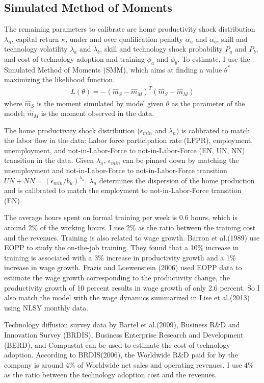 \documentclass[12pt]{article}
\newcommand{\1}{\mathbb{1}}
\begin{document}
\subsection{Simulated Method of Moments}
The remaining parameters to calibrate are home productivity shock distribution $\lambda_n$, capital return $\kappa$, under and over qualification penalty $\alpha_u$ and $\alpha_o$, skill and technology volatility $\lambda_a$ and $\lambda_b$, skill and technology shock probability $P_a$ and $P_b$, and cost of technology adoption and training $\phi_a$ and $\phi_b$. To estimate, I use the Simulated Method of Moments (SMM), which aims at finding a value $\theta^*$ maximizing the likelihood function. 
\begin{align*}
L(\theta) = -(\hat{m}_S-\hat{m}_M)^T(\hat{m}_S-\hat{m}_M)
\end{align*}
where $\hat{m}_S$ is the moment simulated by model given $\theta$ as the parameter of the model; $\hat{m}_M$ is the moment observed in the data. 

The home productivity shock distribution ($\epsilon_{min}$ and $\lambda_n$) is calibrated to match the labor flow in the data: Labor force participation rate (LFPR), employment, unemployment, and not-in-Labor-Force to not-in-Labor-Force (EN, UN, NN) transition in the data. Given $\lambda_n$, $\epsilon_{min}$ can be pinned down by matching the unemployment and not-in-Labor-Force to not-in-Labor-Force transition $UN+NN = (\epsilon_{min}/b_u)^{\lambda_n}$. $\lambda_n$ determines the dispersion of the home production and is calibrated to match the employment to not-in-Labor-Force transition (EN). 

The average hours spent on formal training per week is 0.6 hours, which is around 2\% of the working hours. I use 2\% as the ratio between the training cost and the revenues. Training is also related to wage growth. Barron et al.(1989)\nocite{Barronetal1989
} use EOPP to study the on-the-job training. They found that a 10\% increase in training is associated with a 3\% increase in productivity growth and a 1\% increase in wage growth. Frazis and Loewenstein (2006)\nocite{FrazisLoewenstein2006} used EOPP data to estimate the wage growth corresponding to the productivity change, the productivity growth of 10 percent results in wage growth of only 2.6 percent. So I also match the model with the wage dynamics summarized in Lise et al.(2013)\nocite{Liseetal2013} using NLSY monthly data.  

Technology diffusion survey data by Bartel et al.(2009)\nocite{Barteletal2009}, Business R\&D and Innovation Survey (BRDIS), Business Enterprise Research and Development (BERD), and Compustat can be used to estimate the cost of technology adoption. According to BRDIS(2006), the Worldwide R\&D paid for by the company is around 4\% of Worldwide net sales and operating revenues. I use 4\% as the ratio between the technology adoption cost and the revenues.
\end{document}
